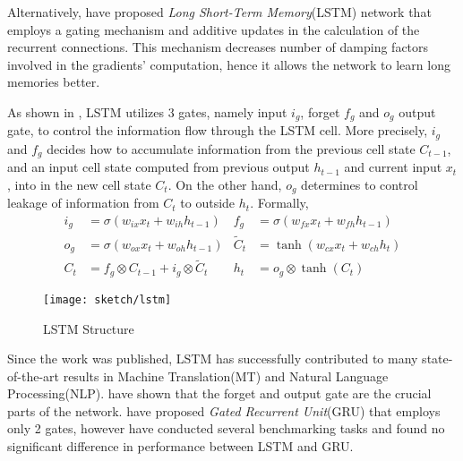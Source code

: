 Alternatively, \cite{HochreiterLongshorttermmemory1997} have proposed \textit{Long Short-Term Memory}(LSTM) network that employs a gating mechanism and additive updates in the calculation of the recurrent connections. This mechanism decreases number of damping factors involved in the gradients' computation, hence it allows the network to learn long memories better.

As shown in \addfigure{\ref{fig:lstm_structure}}, LSTM utilizes 3 gates, namely input $i_g$, forget $f_g$ and $o_g$ output gate, to control the information flow through the LSTM cell. More precisely, $i_g$ and $f_g$ decides how to accumulate information from the previous cell state $C_{t-1}$, and an input cell state computed from previous output $h_{t-1}$ and current input $x_t$, into in the new cell state $C_t$. On the other hand, $o_g$ determines to control leakage of information from $C_t$ to outside $h_t$. Formally, 
\begin{align}
	i_g &= \sigma( w_{ix} x_t + w_{ih} h_{t-1} )  &  	f_g &= \sigma( w_{fx} x_t + w_{fh} h_{t-1} )\\
	o_g &= \sigma( w_{ox} x_t + w_{oh} h_{t-1} ) & \widetilde{C}_t &= \tanh(w_{cx} x_t + w_{ch} h_t) \\
	C_t &= f_g \otimes C_{t-1} + i_g  \otimes  \widetilde{C}_t & h_{t} &= o_g \otimes \tanh(C_t)
\end{align}


\begin{figure}[h]
\centering
\texttt{[image: sketch/lstm]}
\caption{LSTM Structure} 

\label{fig:lstm_structure} 
\end{figure}

Since the work was published, LSTM has successfully contributed to many state-of-the-art results in Machine Translation(MT) and Natural Language Processing(NLP)\cite{MelisStateArtEvaluation2018}. \cite{GreffLSTMsearchspace2017} have shown that the forget and output gate are the crucial parts of the network.  \cite{ChoLearningPhraseRepresentations2014a} have proposed \textit{Gated Recurrent Unit}(GRU) that employs only 2 gates, however \cite{Jozefowiczempiricalexplorationrecurrent2015a} have conducted several benchmarking tasks and found no significant difference in performance between LSTM and GRU. 